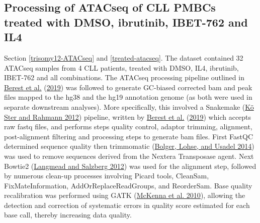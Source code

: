 \documentclass[11pt, a4paper, twosided]{book}
\begin{document}
\hypertarget{processing-of-atacseq-of-cll-pmbcs-treated-with-dmso-ibrutinib-ibet-762-and-il4}{%
\subsection{Processing of ATACseq of CLL PMBCs treated with DMSO, ibrutinib, IBET-762 and IL4}\label{processing-of-atacseq-of-cll-pmbcs-treated-with-dmso-ibrutinib-ibet-762-and-il4}}

Section \ref{trisomy12-ATACseq} and \ref{treated-atacseq}. The dataset contained 32 ATACseq samples from 4 CLL patients, treated with DMSO, IL4, ibrutinib, IBET-762 and all combinations. The ATACseq processing pipeline outlined in \protect\hyperlink{ref-Berest2019}{Berest et al.} (\protect\hyperlink{ref-Berest2019}{2019}) was followed to generate GC-biased corrected bam and peak files mapped to the hg38 and the hg19 annotation genome (as both were used in separate downstream analyses). More specifically, this involved a Snakemake (\protect\hyperlink{ref-Snakemake}{Kö Ster and Rahmann 2012}) pipeline, written by \protect\hyperlink{ref-Berest2019}{Berest et al.} (\protect\hyperlink{ref-Berest2019}{2019}) which accepts raw fastq files, and performs steps quality control, adaptor trimming, alignment, post-alignment filtering and processing steps to generate bam files. First FastQC determined sequence quality then trimmomatic (\protect\hyperlink{ref-Trimmomatic}{Bolger, Lohse, and Usadel 2014}) was used to remove sequences derived from the Nextera Transposase agent. Next Bowtie2 (\protect\hyperlink{ref-Bowtie2}{Langmead and Salzberg 2012}) was used for the alignment step, followed by numerous clean-up processes involving Picard tools, CleanSam, FixMateInformation, AddOrReplaceReadGroups, and ReorderSam. Base quality recalibration was performed using GATK (\protect\hyperlink{ref-GATK}{McKenna et al. 2010}), allowing the detection and correction of systematic errors in quality score estimated for each base call, thereby increasing data quality.
\end{document}
